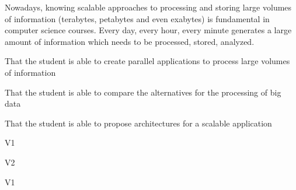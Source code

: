 \begin{syllabus}


\begin{justification}
Nowadays, knowing scalable approaches to processing and storing large volumes of information (terabytes, petabytes and even exabytes) is fundamental in computer science courses. Every day, every hour, every minute generates a large amount of information which needs to be processed, stored, analyzed.
\end{justification}

\begin{goals}
\item That the student is able to create parallel applications to process large volumes of information
\item That the student is able to compare the alternatives for the processing of big data
\item That the student is able to propose architectures for a scalable application
\end{goals}

\begin{outcomes}{V1}
    \item {} 
    \item {} 
    \item {} 
    \item {} 
\end{outcomes}

\begin{outcomes}{V2}
    \item {}
    \item {} 
    \item {} 
\end{outcomes}

\begin{competences}{V1}
    \item {}
    \item {} 
    \item {} 
    \item {} 
    \item {} 
\end{competences}


\end{syllabus}
